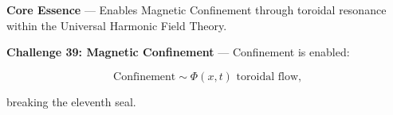 
\textbf{Core Essence} --- Enables Magnetic Confinement through toroidal resonance within the Universal Harmonic Field Theory.

\textbf{Challenge 39: Magnetic Confinement} --- Confinement is enabled:

$$
\text{Confinement} \sim \Phi(x, t) \text{ toroidal flow,}
$$

breaking the eleventh seal.

